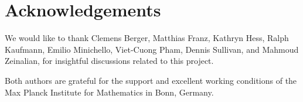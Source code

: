 
\section*{Acknowledgements}

We would like to thank Clemens Berger, Matthias Franz, Kathryn Hess, Ralph Kaufmann, Emilio Minichello, Viet-Cuong Pham, Dennis Sullivan, and Mahmoud Zeinalian, for insightful discussions related to this project.

Both authors are grateful for the support and excellent working conditions of the Max Planck Institute for Mathematics in Bonn, Germany.